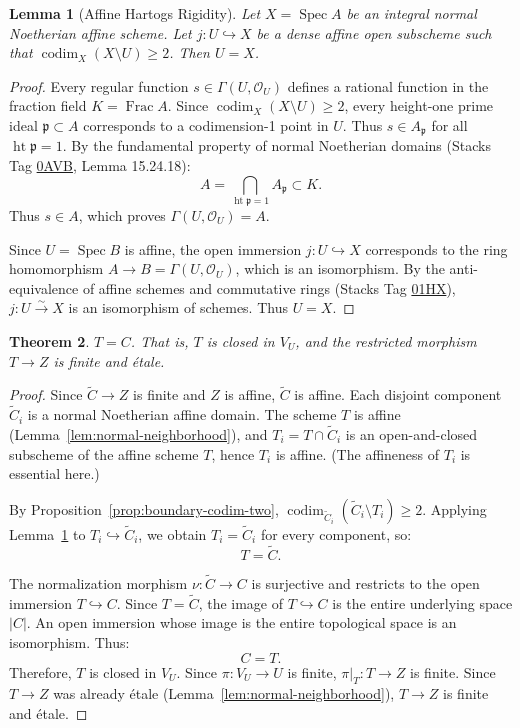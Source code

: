 \documentclass[11pt,reqno]{amsart}
\theoremstyle{plain}
\newtheorem{theorem}{Theorem}[section]
\newtheorem{lemma}[theorem]{Lemma}
\theoremstyle{definition}
\numberwithin{equation}{section}
\DeclareMathOperator{\Spec}{Spec}
\DeclareMathOperator{\codim}{codim}
\DeclareMathOperator{\Frac}{Frac}
\newcommand{\cO}{\mathcal{O}}
\newcommand{\fp}{\mathfrak{p}}
\begin{document}
\begin{lemma}[Affine Hartogs Rigidity]\label{lem:affine-hartogs}
Let $X = \Spec A$ be an integral normal Noetherian affine scheme. Let $j: U \hookrightarrow X$ be a dense affine open subscheme such that $\codim_X(X \setminus U) \ge 2$.
Then $U = X$.
\end{lemma}
\begin{proof}
Every regular function $s \in \Gamma(U, \cO_U)$ defines a rational function in the fraction field $K = \Frac A$.
Since $\codim_X(X \setminus U) \ge 2$, every height-one prime ideal $\fp \subset A$ corresponds to a codimension-1 point in $U$.
Thus $s \in A_\fp$ for all $\operatorname{ht} \fp = 1$.
By the fundamental property of normal Noetherian domains (Stacks Tag \href{https://stacks.math.columbia.edu/tag/0AVB}{0AVB}, Lemma 15.24.18):
\[
A = \bigcap_{\operatorname{ht} \fp = 1} A_\fp \subset K.
\]
Thus $s \in A$, which proves $\Gamma(U, \cO_U) = A$.

Since $U = \Spec B$ is affine, the open immersion $j: U \hookrightarrow X$ corresponds to the ring homomorphism $A \to B = \Gamma(U, \cO_U)$, which is an isomorphism. By the anti-equivalence of affine schemes and commutative rings (Stacks Tag \href{https://stacks.math.columbia.edu/tag/01HX}{01HX}), $j: U \xrightarrow{\sim} X$ is an isomorphism of schemes. Thus $U = X$.
\end{proof}

\begin{theorem}\label{thm:closure-equality}
$T = C$. That is, $T$ is closed in $V_U$, and the restricted morphism $T \to Z$ is finite and \'{e}tale.
\end{theorem}
\begin{proof}
Since $\widetilde{C} \to Z$ is finite and $Z$ is affine, $\widetilde{C}$ is affine. Each disjoint component $\widetilde{C}_i$ is a normal Noetherian affine domain.
The scheme $T$ is affine (Lemma~\ref{lem:normal-neighborhood}), and $T_i = T \cap \widetilde{C}_i$ is an open-and-closed subscheme of the affine scheme $T$, hence $T_i$ is affine. (The affineness of $T_i$ is essential here.)

By Proposition~\ref{prop:boundary-codim-two}, $\codim_{\widetilde{C}_i}(\widetilde{C}_i \setminus T_i) \ge 2$. Applying Lemma~\ref{lem:affine-hartogs} to $T_i \hookrightarrow \widetilde{C}_i$, we obtain $T_i = \widetilde{C}_i$ for every component, so:
\[
T = \widetilde{C}.
\]

The normalization morphism $\nu: \widetilde{C} \to C$ is surjective and restricts to the open immersion $T \hookrightarrow C$.
Since $T = \widetilde{C}$, the image of $T \hookrightarrow C$ is the entire underlying space $|C|$.
An open immersion whose image is the entire topological space is an isomorphism. Thus:
\[
C = T.
\]
Therefore, $T$ is closed in $V_U$. Since $\pi: V_U \to U$ is finite, $\pi|_T: T \to Z$ is finite. Since $T \to Z$ was already \'{e}tale (Lemma~\ref{lem:normal-neighborhood}), $T \to Z$ is finite and \'{e}tale.
\end{proof}
\end{document}
